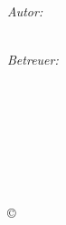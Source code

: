 \begin{titlepage}
\begin{center}
\vspace{0.08\textheight}

\begin{minipage}[t]{0.4\textwidth}
\begin{flushleft} \large
\emph{Autor:}\\
\TPauthorFirst\ \textsc{\TPauthorLast}
\end{flushleft}
\end{minipage}
\hfill
\begin{minipage}[t]{0.4\textwidth}
\begin{flushright} \large
\emph{Betreuer:}\\
\begin{addmargin}[0em]{5em}
\TPsupervisorOneAnrede\\
\end{addmargin}
\TPsupervisorOneFirst\ \textsc{\TPsupervisorOneLast}\\
\begin{addmargin}[0em]{5em}
\TPsupervisorTwoAnrede\\
\end{addmargin}
\TPsupervisorTwoFirst\ \textsc{\TPsupervisorTwoLast}
\end{flushright}
\end{minipage}

\vfill

{\large \copyright\ \TPdate}

\end{center}

\end{titlepage}
